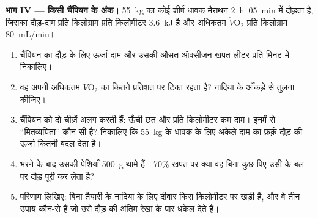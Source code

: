 \begin{problem}
\medskip
\noindent\textbf{भाग IV --- किसी चैंपियन के अंक।}
\qty{55}{kg} का कोई शीर्ष धावक मैराथन \qty{2}{h}\,
\qty{05}{min} में दौड़ता है, जिसका दौड़-दाम प्रति किलोग्राम प्रति
किलोमीटर \qty{3.6}{kJ} है और अधिकतम $\dot V\!\mathrm{O_2}$ प्रति
किलोग्राम \qty{80}{mL/min}।
\begin{enumerate}[resume]
  \item चैंपियन का दौड़ के लिए ऊर्जा-दाम और उसकी औसत ऑक्सीजन-खपत लीटर
        प्रति मिनट में निकालिए।
  \item वह अपनी अधिकतम $\dot V\!\mathrm{O_2}$ का कितने प्रतिशत पर टिका
        रहता है? नादिया के आँकड़े से तुलना कीजिए।
  \item चैंपियन को दो चीज़ें अलग करती हैं: ऊँची छत और प्रति किलोमीटर कम
        दाम। इनमें से ``मितव्ययिता'' कौन-सी है? निकालिए कि \qty{55}{kg}
        के धावक के लिए अकेले दाम का फ़र्क़ दौड़ की ऊर्जा कितनी बदल देता
        है।
  \item भरने के बाद उसकी पेशियाँ \qty{500}{g}  थामे हैं। 70\%
         खपत पर क्या वह बिना कुछ पिए उसी के बल पर दौड़
        पूरी कर लेता है?
  \item परिणाम लिखिए: बिना तैयारी के नादिया के लिए दीवार किस किलोमीटर पर
        खड़ी है, और वे तीन उपाय कौन-से हैं जो उसे दौड़ की अंतिम रेखा के
        पार धकेल देते हैं।
\end{enumerate}
\end{problem}

